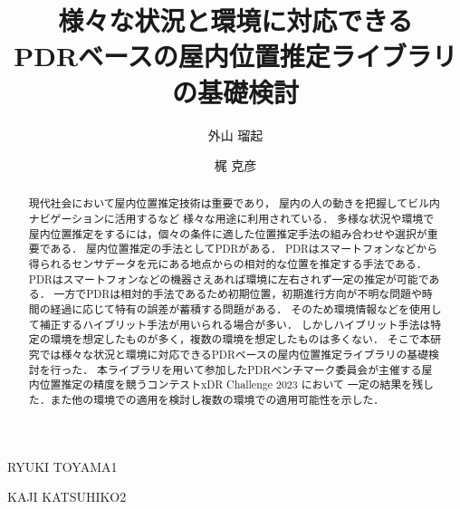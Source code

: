 \documentclass[Japanese]{dicomopapers}
\begin{document}
\title{様々な状況と環境に対応できる\\PDRベースの屋内位置推定ライブラリの基礎検討}



\author{外山 瑠起}{RYUKI TOYAMA}{1}
\author{梶 克彦}{KAJI KATSUHIKO}{2}



\begin{abstract}
	現代社会において屋内位置推定技術は重要であり，
	屋内の人の動きを把握してビル内ナビゲーションに活用するなど
	様々な用途に利用されている．
	多様な状況や環境で屋内位置推定をするには，個々の条件に適した位置推定手法の組み合わせや選択が重要である．
	屋内位置推定の手法としてPDRがある．
	PDRはスマートフォンなどから得られるセンサデータを元にある地点からの相対的な位置を推定する手法である．
	PDRはスマートフォンなどの機器さえあれば環境に左右されず一定の推定が可能である．
	一方でPDRは相対的手法であるため初期位置，初期進行方向が不明な問題や時間の経過に応じて特有の誤差が蓄積する問題がある．
	そのため環境情報などを使用して補正するハイブリット手法が用いられる場合が多い．
	しかしハイブリット手法は特定の環境を想定したものが多く，複数の環境を想定したものは多くない．
	そこで本研究では様々な状況と環境に対応できるPDRベースの屋内位置推定ライブラリの基礎検討を行った．
	本ライブラリを用いて参加したPDRベンチマーク委員会が主催する屋内位置推定の精度を競うコンテストxDR Challenge 2023 において
	一定の結果を残した．また他の環境での適用を検討し複数の環境での適用可能性を示した．
\end{abstract}

\maketitle




















\end{document}
